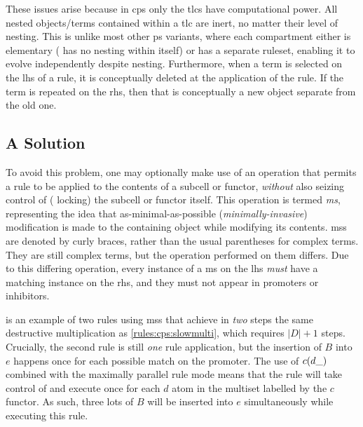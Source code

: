 These issues arise because in \gls{cps} only the \glspl{tlc} have computational power.  All nested objects/terms contained within a \gls{tlc} are inert, no matter their level of nesting.  This is unlike most other \gls{ps} variants, where each \gls{compartment} either is elementary (\ie{} has no nesting within itself) or has a separate ruleset, enabling it to evolve independently despite nesting.  Furthermore, when a term is selected on the \gls{lhs} of a rule, it is conceptually deleted at the application of the rule.  If the term is repeated on the \gls{rhs}, then that is conceptually a new object separate from the old one.

\subsection{A Solution}
To avoid this problem, one may optionally make use of an operation that permits a rule to be applied to the contents of a subcell or \gls{functor}, \emph{without} also seizing control of (\ie{} locking) the subcell or \gls{functor} itself.  This operation is termed \emph{\gls{ms}}, representing the idea that as-minimal-as-possible (\emph{minimally-invasive}) modification is made to the containing object while modifying its contents.  \Glspl{ms} are denoted by curly braces, rather than the usual parentheses for complex terms.  They are still complex terms, but the operation performed on them differs.  Due to this differing operation, every instance of a \gls{ms} on the \gls{lhs} \emph{must} have a matching instance on the \gls{rhs}, and they must not appear in \glspl{promoter} or \glspl{inhibitor}.

\begin{cprulesetfloat}
    \begin{cpruleset}

    \end{cpruleset}
    \caption[Rules for destructive multiplication]{\label{rules:cps:microsurg}Rules for a destructive multiplication process that requires exactly two steps regardless of the numbers multiplied by using \gls{cps} \glspl{ms}}
\end{cprulesetfloat}

 is an example of two rules using \glspl{ms} that achieve in \emph{two} steps the same destructive multiplication as \cref{rules:cps:slowmulti}, which requires \(|D| + 1\) steps.  Crucially, the second rule is still \emph{one} rule application, but the insertion of \(B\) into \(e\) happens once for each possible match on the \gls{promoter}.  The use of \(c(d\_)\) combined with the maximally parallel rule mode means that the rule will take control of and execute once for each \(d\) atom in the multiset labelled by the \(c\) \gls{functor}.  As such, three lots of \(B\) will be inserted into \(e\) simultaneously while executing this rule.


